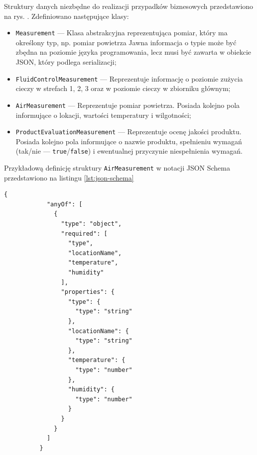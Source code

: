 \documentclass[a4paper, 12pt, twoside]{article}
\begin{document}
Struktury danych niezbędne do realizacji przypadków biznesowych
przedstawiono na rys. . Zdefiniowano następujące klasy:
\begin{itemize}
      \itemsep0em
      \item \texttt{Measurement} --- Klasa abstrakcyjna reprezentująca pomiar, który ma określony typ, np. pomiar powietrza
            Jawna informacja o typie może być zbędna na poziomie języka programowania, lecz musi być zawarta w obiekcie JSON, który podlega serializacji;
      \item \texttt{FluidControlMeasurement} --- Reprezentuje informację o poziomie zużycia cieczy w strefach 1, 2, 3 oraz w poziomie cieczy w zbiorniku głównym;
      \item \texttt{AirMeasurement} --- Reprezentuje pomiar powietrza. Posiada kolejno pola informujące o lokacji, wartości temperatury i wilgotności;
      \item \texttt{ProductEvaluationMeasurement} --- Reprezentuje ocenę jakości produktu. Posiada kolejno pola informujące o nazwie produktu,
            spełnieniu wymagań (tak/nie --- \texttt{true}/\texttt{false}) i ewentualnej przyczynie niespełnienia wymagań.
\end{itemize}
\noindent Przykładową definicję struktury \texttt{AirMeasurement} w notacji 
JSON Schema przedstawiono na listingu \ref{lst:json-schema}\\

\begin{lstlisting}[caption={Przykład definicji obiektu JSON w notacji JSON Schema dla 
      struktury \texttt{AirMeasurement}}, label={lst:json-schema}]
      {
            "anyOf": [
              {
                "type": "object",
                "required": [
                  "type",
                  "locationName",
                  "temperature",
                  "humidity"
                ],
                "properties": {
                  "type": {
                    "type": "string"
                  },
                  "locationName": {
                    "type": "string"
                  },
                  "temperature": {
                    "type": "number"
                  },
                  "humidity": {
                    "type": "number"
                  }
                }
              }
            ]
          }    
\end{lstlisting}
\end{document}
